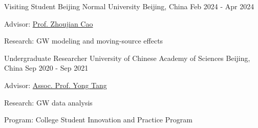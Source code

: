 

\begin{cventries}

  \cventry
    {Visiting Student} %
    {Beijing Normal University} %
    {Beijing, China} %
    {Feb 2024 - Apr 2024} %
    {
      \begin{cvitems} %
        \item{Advisor: \href{https://inspirehep.net/authors/1060083?ui-citation-summary=true&ui-exclude-self-citations=true}{Prof. Zhoujian Cao}}
        \item{Research: GW modeling and moving-source effects}
      \end{cvitems}
    }

  \cventry
    {Undergraduate Researcher} %
    {University of Chinese Academy of Sciences} %
    {Beijing, China} %
    {Sep 2020 - Sep 2021} %
    {
      \begin{cvitems} %
        \item{Advisor: \href{https://inspirehep.net/authors/1040919?ui-citation-summary=true&ui-exclude-self-citations=true}{Assoc. Prof. Yong Tang}}
        \item{Research: GW data analysis}
        \item{Program: College Student Innovation and Practice Program}
      \end{cvitems}
    }

\end{cventries}
